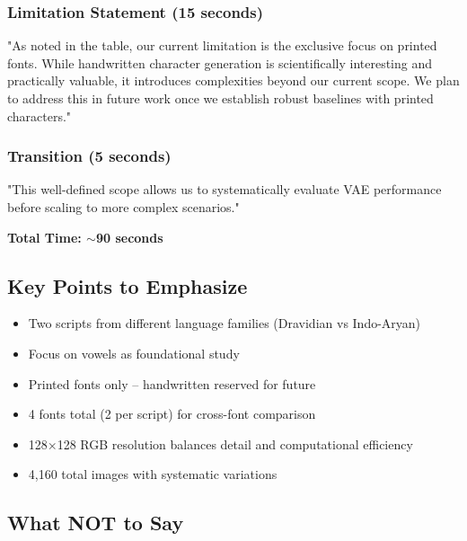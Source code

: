 \documentclass[11pt,a4paper]{article}
\begin{document}
\subsubsection*{Limitation Statement (15 seconds)}
\begin{scriptbox}
"As noted in the table, our current limitation is the exclusive focus on printed fonts. While handwritten character generation is scientifically interesting and practically valuable, it introduces complexities beyond our current scope. We plan to address this in future work once we establish robust baselines with printed characters."
\end{scriptbox}

\subsubsection*{Transition (5 seconds)}
\begin{scriptbox}
"This well-defined scope allows us to systematically evaluate VAE performance before scaling to more complex scenarios."
\end{scriptbox}

\textbf{Total Time: $\sim$90 seconds}

\subsection{Key Points to Emphasize}

\begin{keybox}
\begin{itemize}[leftmargin=0.5cm]
    \item Two scripts from different language families (Dravidian vs Indo-Aryan)
    \item Focus on vowels as foundational study
    \item Printed fonts only -- handwritten reserved for future
    \item 4 fonts total (2 per script) for cross-font comparison
    \item 128×128 RGB resolution balances detail and computational efficiency
    \item 4,160 total images with systematic variations
\end{itemize}
\end{keybox}

\subsection{What NOT to Say}
\end{document}
